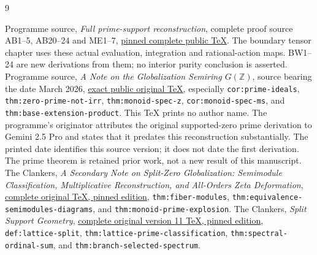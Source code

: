 \documentclass[11pt,a4paper]{article}
\theoremstyle{definition}\newtheorem{definition}[theorem]{Definition}
\newcommand{\Z}{\mathbb Z}\newcommand{\Q}{\mathbb Q}
\begin{document}
\begin{thebibliography}{9}

 Programme source, \emph{Full prime-support reconstruction}, complete proof source AB1--5, AB20--24 and ME1--7, \href{https://github.com/KokunoYumeto/zeta-function-research-reader/blob/3c78cfbd9e194d35117b33277c421c6564ce3dbf/workbenches/splitzero-tandem/continuations/20260923-full-prime-support/031/01_REBUILT_MATHEMATICS.tex}{pinned complete public TeX}. The boundary tensor chapter uses these actual evaluation, integration and rational-action maps. BW1--24 are new derivations from them; no interior purity conclusion is asserted.
 Programme source, \emph{A Note on the Globalization Semiring $G(\Z)$}, source bearing the date March 2026, \href{https://github.com/KokunoYumeto/zeta-function-research-reader/blob/d2f0020a7c446f429682925c1c682d99ba86a4cc/workbenches/splitzero-tandem/foundations/globalization-semiring/globalization_note.tex}{exact public original TeX}, especially \texttt{cor:prime-ideals}, \texttt{thm:zero-prime-not-irr}, \texttt{thm:monoid-spec-z}, \texttt{cor:monoid-spec-ms}, and \texttt{thm:base-extension-product}. This TeX prints no author name. The programme's originator attributes the original supported-zero prime derivation to Gemini 2.5 Pro and states that it predates this reconstruction substantially. The printed date identifies this source version; it does not date the first derivation. The prime theorem is retained prior work, not a new result of this manuscript.
 The Clankers, \emph{A Secondary Note on Split-Zero Globalization: Semimodule Classification, Multiplicative Reconstruction, and All-Orders Zeta Deformation}, \href{https://github.com/KokunoYumeto/zeta-function-research-reader/blob/4f0bccd3a0e9d159dbb379bfbe4835054abc298d/workbenches/splitzero-tandem/continuations/20260919-corpus-cohomology-metric-receivers/corpus_sources/split_zero_secondary_note.tex}{complete original TeX, pinned edition}, \texttt{thm:fiber-modules}, \texttt{thm:equivalence-semimodules-diagrams}, and \texttt{thm:monoid-prime-explosion}.
 The Clankers, \emph{Split Support Geometry}, \href{https://github.com/KokunoYumeto/zeta-function-research-reader/blob/a2851f9eb352e7e4376bc629de86fa4ed9c1c434/workbenches/splitzero-tandem/foundations/split-support-geometry-v11/split_support_geometry_arithmetic_curve_v11.tex}{complete original version 11 TeX, pinned edition}, \texttt{def:lattice-split}, \texttt{thm:lattice-prime-classification}, \texttt{thm:spectral-ordinal-sum}, and \texttt{thm:branch-selected-spectrum}.

\end{thebibliography}
\end{document}
